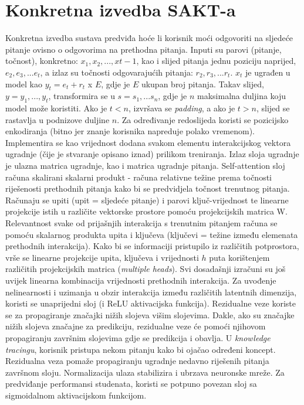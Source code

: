	\section{Konkretna izvedba SAKT-a}	
	Konkretna izvedba sustava predviđa hoće li korisnik moći odgovoriti na sljedeće pitanje ovisno o odgovorima na prethodna pitanja. Inputi su parovi (pitanje, točnost), konkretno: $x_1, x_2, ..., x{t-1}$, kao i slijed pitanja jednu poziciju naprijed, $e_2, e_3, ... e_t$, a izlaz su točnosti odgovarajućih pitanja: $r_2, r_3, ... r_t$. $x_t$ je ugrađen u model kao $y_t = e_t + r_t$ x $E$, gdje je $E$ ukupan broj pitanja. Takav slijed, $y = y_1, ..., y_t$, transformira se u $s = s_1, ... s_n$, gdje je $n$ maksimalna duljina koju model može koristiti. Ako je $t<n$, izvršava se \textit{padding}, a ako je $t>n$, slijed se rastavlja u podnizove duljine $n$. \newline
	Za određivanje redoslijeda koristi se pozicijsko enkodiranja (bitno jer znanje korisnika napreduje polako vremenom). Implementira se kao vrijednost dodana svakom elementu interakcijskog vektora ugradnje (čije je stvaranje opisano iznad) prilikom treniranja. Izlaz sloja ugradnje je ulazna matrica ugradnje, kao i matrica ugradnje pitanja.\newline
	Self-attention sloj računa skalirani skalarni produkt - računa relativne težine prema točnosti riješenosti prethodnih pitanja kako bi se predvidjela točnost trenutnog pitanja. Računaju se upiti (upit = sljedeće pitanje) i parovi ključ-vrijednost te linearne projekcije istih u različite vektorske prostore pomoću projekcijskih matrica W. Relevantnost svake od prijašnjih interakcija s trenutnim pitanjem računa se pomoću skalarnog produkta upita i ključeva (ključevi = težine između elemenata prethodnih interakcija). Kako bi se informaciji pristupilo iz različitih potprostora, vrše se linearne projekcije upita, ključeva i vrijednosti $h$ puta korištenjem različitih projekcijskih matrica (\textit{multiple heads}).\newline
	Svi dosadašnji izračuni su još uvijek linearna kombinacija vrijednosti prethodnih interakcija. Za uvođenje nelinearnosti i uzimanja u obzir interakcija između različitih latentnih dimenzija, koristi se unaprijedni sloj (i ReLU aktivacijska funkcija).\newline
	Rezidualne veze koriste se za propagiranje značajki nižih slojeva višim slojevima. Dakle, ako su značajke nižih slojeva značajne za predikciju, rezidualne veze će pomoći njihovom propagiranju završnim slojevima gdje se predikcija i obavlja. U \textit{knowledge tracingu}, korisnik pristupa nekom pitanju kako bi ojačao određeni koncept. Rezidualna veza pomaže propagiranju ugradnje nedavno riješenih pitanja završnom sloju. \newline
	Normalizacija ulaza stabilizira i ubrzava neuronske mreže. \newline
	Za predviđanje performansi studenata, koristi se potpuno povezan sloj sa sigmoidalnom aktivacijskom funkcijom.


